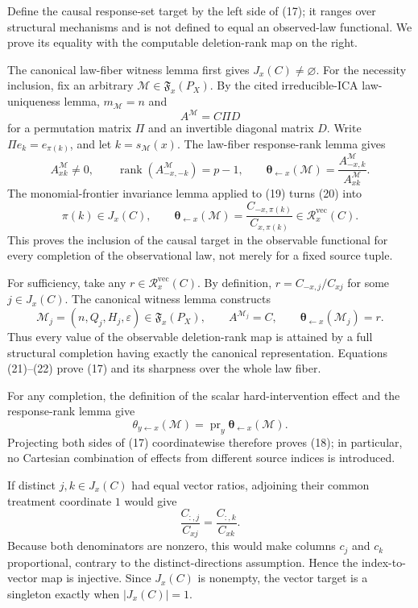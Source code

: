 Define the causal response-set target by the left side of (17); it ranges over structural mechanisms and is not defined to equal an observed-law functional. We prove its equality with the computable deletion-rank map on the right.

The canonical law-fiber witness lemma first gives \(J_x(C)\ne\varnothing\). For the necessity inclusion, fix an arbitrary \(\mathcal M\in\mathfrak F_x(P_X)\). By the cited irreducible-ICA law-uniqueness lemma, \(m_{\mathcal M}=n\) and
\[
 A^{\mathcal M}=C\Pi D \tag{19}
\]
for a permutation matrix \(\Pi\) and an invertible diagonal matrix \(D\). Write \(\Pi e_k=e_{\pi(k)}\), and let \(k=s_{\mathcal M}(x)\). The law-fiber response-rank lemma gives
\[
 A^{\mathcal M}_{xk}\ne0,
 \qquad \operatorname{rank}(A^{\mathcal M}_{-x,-k})=p-1,
 \qquad
 \boldsymbol\theta_{\leftarrow x}(\mathcal M)
 =\frac{A^{\mathcal M}_{-x,k}}{A^{\mathcal M}_{xk}}. \tag{20}
\]
The monomial-frontier invariance lemma applied to (19) turns (20) into
\[
 \pi(k)\in J_x(C),
 \qquad
 \boldsymbol\theta_{\leftarrow x}(\mathcal M)
 =\frac{C_{-x,\pi(k)}}{C_{x,\pi(k)}}
 \in\mathcal R_x^{\mathrm{vec}}(C). \tag{21}
\]
This proves the inclusion of the causal target in the observable functional for every completion of the observational law, not merely for a fixed source tuple.

For sufficiency, take any \(r\in\mathcal R_x^{\mathrm{vec}}(C)\). By definition, \(r=C_{-x,j}/C_{xj}\) for some \(j\in J_x(C)\). The canonical witness lemma constructs
\[
 \mathcal M_j=(n,Q_j,H_j,\varepsilon)\in\mathfrak F_x(P_X),
 \qquad A^{\mathcal M_j}=C,
 \qquad
 \boldsymbol\theta_{\leftarrow x}(\mathcal M_j)=r. \tag{22}
\]
Thus every value of the observable deletion-rank map is attained by a full structural completion having exactly the canonical representation. Equations (21)--(22) prove (17) and its sharpness over the whole law fiber.

For any completion, the definition of the scalar hard-intervention effect and the response-rank lemma give
\[
 \theta_{y\leftarrow x}(\mathcal M)
 =\operatorname{pr}_y\boldsymbol\theta_{\leftarrow x}(\mathcal M).
\]
Projecting both sides of (17) coordinatewise therefore proves (18); in particular, no Cartesian combination of effects from different source indices is introduced.

If distinct \(j,k\in J_x(C)\) had equal vector ratios, adjoining their common treatment coordinate \(1\) would give
\[
 \frac{C_{:,j}}{C_{xj}}=\frac{C_{:,k}}{C_{xk}}.
\]
Because both denominators are nonzero, this would make columns \(c_j\) and \(c_k\) proportional, contrary to the distinct-directions assumption. Hence the index-to-vector map is injective. Since \(J_x(C)\) is nonempty, the vector target is a singleton exactly when \(|J_x(C)|=1\).

